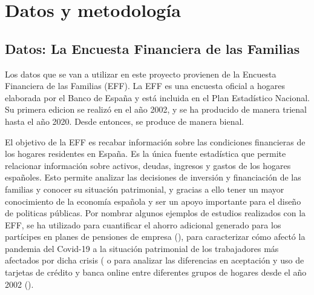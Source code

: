 \chapter{Datos y metodología}
\label{chapter:datos_metodologia}
\section{Datos: La Encuesta Financiera de las Familias}

Los datos que se van a utilizar en este proyecto provienen de la Encuesta Financiera de las Familias (EFF). La EFF es una encuesta oficial a hogares elaborada por el Banco de España y está incluida en el Plan Estadístico Nacional. Su primera edicion se realizó en el año 2002, y se ha producido de manera trienal hasta el año 2020. Desde entonces, se produce de manera bienal.

El objetivo de la EFF es recabar información sobre las condiciones financieras de los hogares residentes en España. Es la única fuente estadística que permite relacionar información sobre activos, deudas, ingresos y gastos de los hogares españoles. Esto permite analizar las decisiones de inversión y financiación de las familias y conocer su situación patrimonial, y gracias a ello tener un mayor conocimiento de la economía española y ser un apoyo importante para el diseño de politicas públicas. Por nombrar algunos ejemplos de estudios realizados con la EFF, se ha utilizado para cuantificar el ahorro adicional generado para los partícipes en planes de pensiones de empresa (\cite{gomez2022pensiones}), para caracterizar cómo afectó la pandemia del Covid-19 a la situación patrimonial de los trabajadores más afectados por dicha crisis (\cite{alvargonzalez2020pandemia} o para analizar las diferencias en aceptación y uso de tarjetas de crédito y banca online entre diferentes grupos de hogares desde el año 2002 (\cite{crespo2023bancaonline}).

